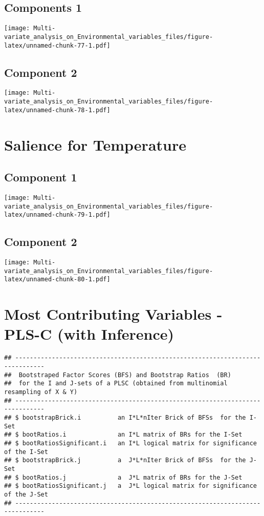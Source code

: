 \documentclass[]{book}
\begin{document}
\hypertarget{components-1}{%
\subsection{Components 1}\label{components-1}}

\texttt{[image: Multi-variate\_analysis\_on\_Environmental\_variables\_files/figure-latex/unnamed-chunk-77-1.pdf]}

\hypertarget{component-2}{%
\subsection{Component 2}\label{component-2}}

\texttt{[image: Multi-variate\_analysis\_on\_Environmental\_variables\_files/figure-latex/unnamed-chunk-78-1.pdf]}

\hypertarget{salience-for-temperature}{%
\section{Salience for Temperature}\label{salience-for-temperature}}

\hypertarget{component-1}{%
\subsection{Component 1}\label{component-1}}

\texttt{[image: Multi-variate\_analysis\_on\_Environmental\_variables\_files/figure-latex/unnamed-chunk-79-1.pdf]}

\hypertarget{component-2-1}{%
\subsection{Component 2}\label{component-2-1}}

\texttt{[image: Multi-variate\_analysis\_on\_Environmental\_variables\_files/figure-latex/unnamed-chunk-80-1.pdf]}

\hypertarget{most-contributing-variables---pls-c-with-inference}{%
\section{Most Contributing Variables - PLS-C (with
Inference)}\label{most-contributing-variables---pls-c-with-inference}}

\begin{verbatim}
## ------------------------------------------------------------------------------
##  Bootstraped Factor Scores (BFS) and Bootstrap Ratios  (BR) 
##  for the I and J-sets of a PLSC (obtained from multinomial resampling of X & Y) 
## ------------------------------------------------------------------------------
## $ bootstrapBrick.i          an I*L*nIter Brick of BFSs  for the I-Set
## $ bootRatios.i              an I*L matrix of BRs for the I-Set
## $ bootRatiosSignificant.i   an I*L logical matrix for significance of the I-Set
## $ bootstrapBrick.j          a  J*L*nIter Brick of BFSs  for the J-Set
## $ bootRatios.j              a  J*L matrix of BRs for the J-Set
## $ bootRatiosSignificant.j   a  J*L logical matrix for significance of the J-Set
## ------------------------------------------------------------------------------
\end{verbatim}
\end{document}
